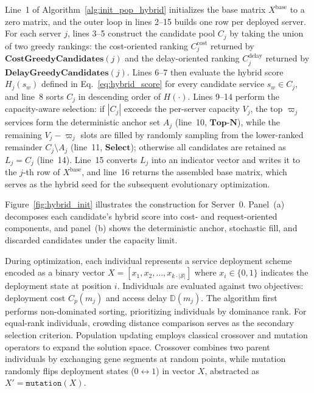 \documentclass[10pt, conference, letterpaper]{IEEEtran}
\begin{document}
Line~1 of Algorithm~\ref{alg:init_pop_hybrid} initializes the base matrix $X^{\mathrm{base}}$ to a zero
  matrix, and the outer loop in lines 2--15 builds one row per deployed server. For each server $j$, lines 3--5
  construct the candidate pool $C_j$ by taking the union of two greedy rankings: the cost-oriented ranking
  $C_j^{\mathrm{cost}}$ returned by $\textbf{CostGreedyCandidates}(j)$ and the delay-oriented ranking
  $C_j^{\mathrm{delay}}$ returned by $\textbf{DelayGreedyCandidates}(j)$. Lines 6--7 then evaluate the hybrid
  score $H_j(s_w)$ defined in Eq.~\eqref{eq:hybrid_score} for every candidate service $s_w \in C_j$, and line~8
  sorts $C_j$ in descending order of $H(\cdot)$. Lines 9--14 perform the capacity-aware selection: if $|C_j|$
  exceeds the per-server capacity $V_j$, the top $\varpi_j$ services form the deterministic anchor set $A_j$
  (line~10, $\textbf{Top-N}$), while the remaining $V_j - \varpi_j$ slots are filled by randomly sampling from
  the lower-ranked remainder $C_j \setminus A_j$ (line~11, $\textbf{Select}$); otherwise all candidates are
  retained as $L_j = C_j$ (line~14). Line~15 converts $L_j$ into an indicator vector and writes it to the $j$-th
   row of $X^{\mathrm{base}}$, and line~16 returns the assembled base matrix, which serves as the hybrid seed
  for the subsequent evolutionary optimization.


Figure~\ref{fig:hybrid_init} illustrates the construction for Server~0. Panel~(a) decomposes each candidate's hybrid score into cost- and request-oriented components, and panel~(b) shows the deterministic anchor, stochastic fill, and discarded candidates under the capacity limit.


During optimization, each individual represents a service deployment scheme encoded as a binary vector $X = [x_1, x_2, \dots, x_{k \cdot |\mathcal{S}|}]$ where $x_i \in \{0,1\}$ indicates the deployment state at position $i$. Individuals are evaluated against two objectives: deployment cost $C_p(m_j)$ and access delay $\mathbb{D}(m_j)$. The algorithm first performs non-dominated sorting, prioritizing individuals by dominance rank. For equal-rank individuals, crowding distance comparison serves as the secondary selection criterion. Population updating employs classical crossover and mutation operators to expand the solution space. Crossover combines two parent individuals by exchanging gene segments at random points, while mutation randomly flips deployment states ($0 \leftrightarrow 1$) in vector $X$, abstracted as $X'= \texttt{mutation} (X)$. 
\end{document}
